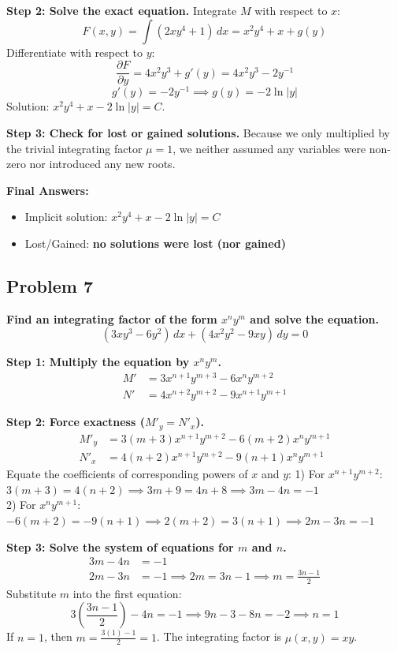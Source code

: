 \documentclass[11pt]{article}
\begin{document}
\textbf{Step 2: Solve the exact equation.} Integrate $M$ with respect to $x$:
\[ F(x, y) = \int (2xy^4 + 1) \, dx = x^2y^4 + x + g(y) \]
Differentiate with respect to $y$:
\[ \frac{\partial F}{\partial y} = 4x^2y^3 + g'(y) = 4x^2y^3 - 2y^{-1} \]
\[ g'(y) = -2y^{-1} \implies g(y) = -2\ln|y| \]
Solution: $x^2y^4 + x - 2\ln|y| = C$.

\textbf{Step 3: Check for lost or gained solutions.} Because we only multiplied by the trivial integrating factor $\mu = 1$, we neither assumed any variables were non-zero nor introduced any new roots.

\textbf{Final Answers:}
\begin{itemize}
    \item Implicit solution: $x^2y^4 + x - 2\ln|y| = C$
    \item Lost/Gained: \textbf{no solutions were lost (nor gained)}
\end{itemize}

\hrulefill

\subsection*{Problem 7}
\textbf{Find an integrating factor of the form $x^n y^m$ and solve the equation.}
\[ (3xy^3 - 6y^2) \, dx + (4x^2y^2 - 9xy) \, dy = 0 \]

\textbf{Step 1: Multiply the equation by $x^n y^m$.}
\begin{align*}
    M' &= 3x^{n+1}y^{m+3} - 6x^ny^{m+2} \\
    N' &= 4x^{n+2}y^{m+2} - 9x^{n+1}y^{m+1}
\end{align*}

\textbf{Step 2: Force exactness ($M'_y = N'_x$).}
\begin{align*}
    M'_y &= 3(m + 3)x^{n+1}y^{m+2} - 6(m + 2)x^ny^{m+1} \\
    N'_x &= 4(n + 2)x^{n+1}y^{m+2} - 9(n + 1)x^ny^{m+1}
\end{align*}
Equate the coefficients of corresponding powers of $x$ and $y$:
1) For $x^{n+1}y^{m+2}$: $3(m + 3) = 4(n + 2) \implies 3m + 9 = 4n + 8 \implies 3m - 4n = -1$ \\
2) For $x^ny^{m+1}$: $-6(m + 2) = -9(n + 1) \implies 2(m + 2) = 3(n + 1) \implies 2m - 3n = -1$

\textbf{Step 3: Solve the system of equations for $m$ and $n$.}
\begin{align*}
    3m - 4n &= -1 \\
    2m - 3n &= -1 \implies 2m = 3n - 1 \implies m = \frac{3n - 1}{2}
\end{align*}
Substitute $m$ into the first equation:
\[ 3\left(\frac{3n - 1}{2}\right) - 4n = -1 \implies 9n - 3 - 8n = -2 \implies n = 1 \]
If $n = 1$, then $m = \frac{3(1)-1}{2} = 1$. The integrating factor is $\mu(x, y) = xy$.
\end{document}
